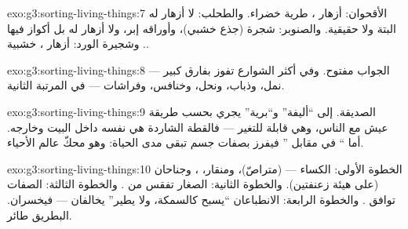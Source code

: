 \begin{solution}{exo:g3:sorting-living-things:7}
الأقحوان: أزهار ،  طرية خضراء. والطحلب: لا أزهار له
البتة ولا  حقيقية. والصنوبر: شجرة (جذع خشبي)، وأوراقه إبر، ولا
أزهار له بل أكواز فيها . وشجيرة الورد: أزهار ، 
خشبية.
\end{solution}

\begin{solution}{exo:g3:sorting-living-things:8}
الجواب مفتوح. وفي أكثر الشوارع تفوز  بفارق كبير --- نمل،
وذباب، ونحل، وخنافس، وفراشات ---  في المرتبة الثانية.
\end{solution}

\begin{solution}{exo:g3:sorting-living-things:9}
 الصديقة.  إلى ``أليفة'' و``برية'' يجري بحسب طريقة عيش
 مع الناس، وهي قابلة للتغير --- فالقطة الشاردة هي 
نفسه داخل البيت وخارجه. أما `` في مقابل '' فيفرز
بصفات جسم تبقى مدى الحياة: وهو محكّ عالم الأحياء.
\end{solution}

\begin{solution}{exo:g3:sorting-living-things:10}
الخطوة الأولى: الكساء ---  (متراصّ)، ومنقار، ، وجناحان
(على هيئة زعنفتين). والخطوة الثانية: الصغار تفقس من . والخطوة
الثالثة: الصفات توافق . والخطوة الرابعة: الانطباعان ``يسبح
كالسمكة، ولا يطير'' يخالفان --- فيخسران. البطريق طائر.
\end{solution}
